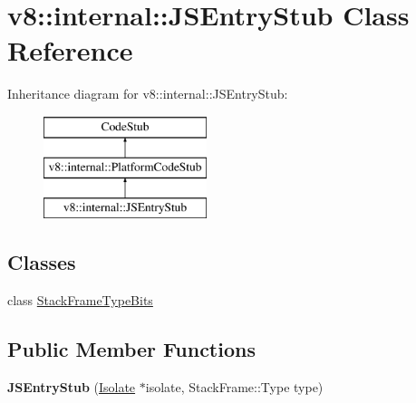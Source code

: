 \hypertarget{classv8_1_1internal_1_1_j_s_entry_stub}{}\section{v8\+:\+:internal\+:\+:J\+S\+Entry\+Stub Class Reference}
\label{classv8_1_1internal_1_1_j_s_entry_stub}
Inheritance diagram for v8\+:\+:internal\+:\+:J\+S\+Entry\+Stub\+:\begin{figure}[H]
\begin{center}
\leavevmode
\includegraphics[height=3.000000cm]{classv8_1_1internal_1_1_j_s_entry_stub}
\end{center}
\end{figure}
\subsection*{Classes}
\begin{DoxyCompactItemize}
\item 
class \hyperlink{classv8_1_1internal_1_1_j_s_entry_stub_1_1_stack_frame_type_bits}{Stack\+Frame\+Type\+Bits}
\end{DoxyCompactItemize}
\subsection*{Public Member Functions}
\begin{DoxyCompactItemize}
\item 
{\bfseries J\+S\+Entry\+Stub} (\hyperlink{classv8_1_1internal_1_1_isolate}{Isolate} $\ast$isolate, Stack\+Frame\+::\+Type type)\hypertarget{classv8_1_1internal_1_1_j_s_entry_stub_a50918ea2c1651461b2d0dbead7370536}{}\label{classv8_1_1internal_1_1_j_s_entry_stub_a50918ea2c1651461b2d0dbead7370536}

\end{DoxyCompactItemize}
